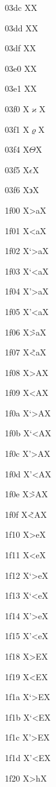 \documentclass[11pt]{article}
\begin{document}
03dc X{\textgreek{\Digamma}}X

03dd X{\textgreek{\digamma}}X

03df X{\textgreek{\koppa}}X

03e0 X{\textgreek{\Sampi}}X

03e1 X{\textgreek{\sampi}}X

03f0 X{\ensuremath{\varkappa}}X

03f1 X{\ensuremath{\varrho}}X

03f4 X{\ensuremath{\Theta}}X

03f5 X{\ensuremath{\epsilon}}X

03f6 X{\ensuremath{\backepsilon}}X

1f00 X{\textgreek{>a}}X

1f01 X{\textgreek{<a}}X

1f02 X{\textgreek{`>a}}X

1f03 X{\textgreek{`<a}}X

1f04 X{\textgreek{'>a}}X

1f05 X{\textgreek{'<a}}X

1f06 X{\textgreek{\~{>a}}}X

1f07 X{\textgreek{\~{<a}}}X

1f08 X{\textgreek{>A}}X

1f09 X{\textgreek{<A}}X

1f0a X{\textgreek{`>A}}X

1f0b X{\textgreek{`<A}}X

1f0c X{\textgreek{'>A}}X

1f0d X{\textgreek{'<A}}X

1f0e X{\textgreek{\~{>A}}}X

1f0f X{\textgreek{\~{<A}}}X

1f10 X{\textgreek{>e}}X

1f11 X{\textgreek{<e}}X

1f12 X{\textgreek{`>e}}X

1f13 X{\textgreek{`<e}}X

1f14 X{\textgreek{'>e}}X

1f15 X{\textgreek{'<e}}X

1f18 X{\textgreek{>E}}X

1f19 X{\textgreek{<E}}X

1f1a X{\textgreek{`>E}}X

1f1b X{\textgreek{`<E}}X

1f1c X{\textgreek{'>E}}X

1f1d X{\textgreek{'<E}}X

1f20 X{\textgreek{>h}}X
\end{document}
